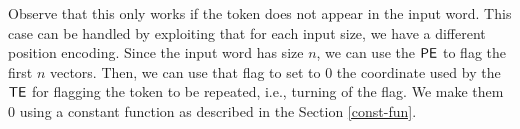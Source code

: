 \medskip

Observe that this only works if the token does not appear in the input word.
This case can be handled by exploiting that for each input size, we have a different position encoding.
Since the input word has size $n$, we can use the $\mathsf{PE}$ to flag the first $n$ vectors.
Then, we can use that flag to set to $0$ the coordinate used by the $\mathsf{TE}$ for flagging the token to be repeated, i.e., turning of the flag.
We make them $0$ using a constant function as described in the Section \ref{const-fun}.


